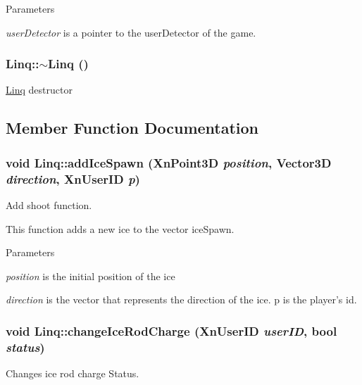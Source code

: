 \begin{DoxyParams}{Parameters}
\item[{\em userDetector}]is a pointer to the userDetector of the game. \end{DoxyParams}
\hypertarget{classLinq_ab33fc2c4487bf5f64ffb34630c147e9a}{
\subsubsection[{$\sim$Linq}]{\setlength{\rightskip}{0pt plus 5cm}Linq::$\sim$Linq ()}}
\label{classLinq_ab33fc2c4487bf5f64ffb34630c147e9a}
\hyperlink{classLinq}{Linq} destructor 

\subsection{Member Function Documentation}
\hypertarget{classLinq_a0a47d35b795ff8ee0e43bcec1528c448}{
\subsubsection[{addIceSpawn}]{\setlength{\rightskip}{0pt plus 5cm}void Linq::addIceSpawn (XnPoint3D {\em position}, \/  {\bf Vector3D} {\em direction}, \/  XnUserID {\em p})}}
\label{classLinq_a0a47d35b795ff8ee0e43bcec1528c448}
Add shoot function.

This function adds a new ice to the vector iceSpawn.


\begin{DoxyParams}{Parameters}
\item[{\em position}]is the initial position of the ice \item[{\em direction}]is the vector that represents the direction of the ice.  p is the player's id. \end{DoxyParams}
\hypertarget{classLinq_a035c5e48d36a6601d9234ac24c40e2c7}{
\subsubsection[{changeIceRodCharge}]{\setlength{\rightskip}{0pt plus 5cm}void Linq::changeIceRodCharge (XnUserID {\em userID}, \/  bool {\em status})}}
\label{classLinq_a035c5e48d36a6601d9234ac24c40e2c7}
Changes ice rod charge Status.

